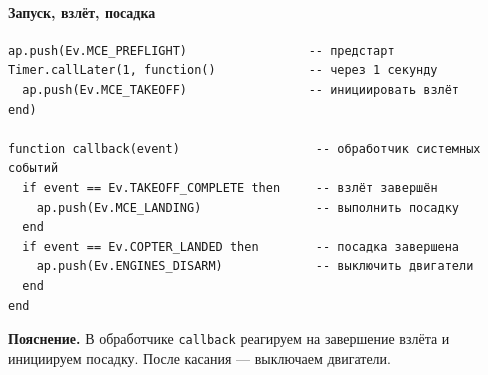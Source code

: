 \paragraph{Запуск, взлёт, посадка}
\begin{verbatim}
ap.push(Ev.MCE_PREFLIGHT)                 -- предстарт
Timer.callLater(1, function()             -- через 1 секунду
  ap.push(Ev.MCE_TAKEOFF)                 -- инициировать взлёт
end)

function callback(event)                   -- обработчик системных событий
  if event == Ev.TAKEOFF_COMPLETE then     -- взлёт завершён
    ap.push(Ev.MCE_LANDING)                -- выполнить посадку
  end
  if event == Ev.COPTER_LANDED then        -- посадка завершена
    ap.push(Ev.ENGINES_DISARM)             -- выключить двигатели
  end
end
\end{verbatim}
\textbf{Пояснение.} В обработчике \texttt{callback} реагируем на завершение взлёта и инициируем посадку. После касания — выключаем двигатели.
